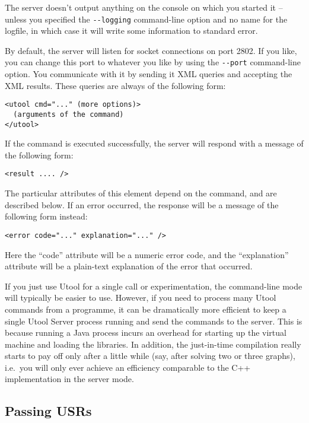 The server doesn't output anything on the console on which you started
it -- unless you specified the \verb?--logging? command-line option
and no name for the logfile, in which case it will write some
information to standard error. 

By default, the server will listen for socket connections on port
2802. If you like, you can change this port to whatever you like by
using the \verb?--port? command-line option. You communicate with it
by sending it XML queries and accepting the XML results. These queries
are always of the following form:

\begin{verbatim}
<utool cmd="..." (more options)>
  (arguments of the command)
</utool>
\end{verbatim}

If the command is executed successfully, the server will respond with
a message of the following form:

\begin{verbatim}
<result .... />
\end{verbatim}

The particular attributes of this element depend on the command, and
are described below. If an error occurred, the response will be a
message of the following form instead:

\begin{verbatim}
<error code="..." explanation="..." />
\end{verbatim}

Here the ``code'' attribute will be a numeric error code, and the
``explanation'' attribute will be a plain-text explanation of the
error that occurred.

If you just use Utool for a single call or experimentation, the
command-line mode will typically be easier to use. However, if you
need to process many Utool commands from a programme, it can be
dramatically more efficient to keep a single Utool Server process
running and send the commands to the server. This is because running a
Java process incurs an overhead for starting up the virtual machine
and loading the libraries. In addition, the just-in-time compilation
really starts to pay off only after a little while (say, after solving
two or three graphs), i.e.\ you will only ever achieve an efficiency
comparable to the C++ implementation in the server mode.


\subsection{Passing USRs}

